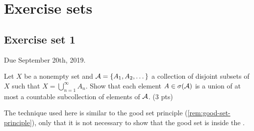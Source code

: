 

\chapter{Exercise sets}

\section{Exercise set 1}

Due September 20th, 2019.


\begin{ex}
	Let $X$ be a nonempty set and $\mathcal{A} = \{A_1, A_2, \dots\}$ a collection of disjoint subsets of $X$ such that $X = \bigcup_{n = 1}^\infty A_n$. Show that each element $A \in \sigma(\mathcal{A})$ is a union of at most a countable subcollection of elements of $\mathcal{A}$. (3 pts)
\end{ex}

The technique used here is similar to the good set principle (\autoref{rem:good-set-principle}), only that it is not necessary to show that the good set is inside the \siga.

